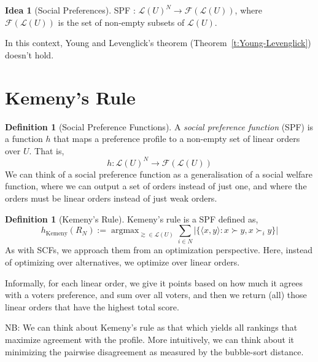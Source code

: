\documentclass{book}
\theoremstyle{plain}
\theoremstyle{definition}
\newtheorem{definition}[theorem]{Definition}
\newtheorem{idea}[theorem]{Idea}
\theoremstyle{remark}
\begin{document}
\begin{idea}[Social Preferences]
    SPF : $\mathcal{L}(U)^N \to \mathcal{F}(\mathcal{L}(U))$, 
    where $\mathcal{F}(\mathcal{L}(U))$ is the set of non-empty subsets of $\mathcal{L}(U)$.

    In this context, 
    Young and Levenglick's theorem (Theorem~\ref{t:Young-Levenglick})
    doesn't hold.
\end{idea}

\section{Kemeny's Rule}


\begin{definition}[Social Preference Functions]
    A \emph{social preference function} (SPF) is a function $h$
    that maps a preference profile to a non-empty set of linear orders over $U$.
    That is, 
    \[
        h : \mathcal{L}(U)^N \to \mathcal{F}(\mathcal{L}(U))
    \]
    We can think of a 
    social preference function as a generalisation of a social welfare function,
    where we can output a set of orders instead of just one, 
    and where the orders must be linear orders instead of just weak orders.
\end{definition}

\begin{definition}[Kemeny's Rule]
    Kemeny's rule is 
    a SPF defined as,
    \[
        h_{\text{Kemeny}}(R_N) := \operatorname{argmax}_{\gtrsim \in \mathcal{L}(U)} \sum_{i \in N} |\{\langle x, y\rangle : x \succ y, x \succ_i y\}|
    \]
    As with SCFs, we approach them from 
    an optimization perspective.
    Here, instead of optimizing over 
    alternatives, we optimize over linear orders.

    Informally, for each linear order, 
    we give it points based on how much it agrees with 
    a voters preference, and sum over all voters, and then we return (all) those linear orders that have the highest total score.

    NB: We can think about Kemeny's rule as that which yields all rankings that 
    maximize agreement with the profile. More intuitively, we can think about it minimizing the 
    pairwise disagreement as measured by the bubble-sort distance.
\end{definition}
\end{document}
